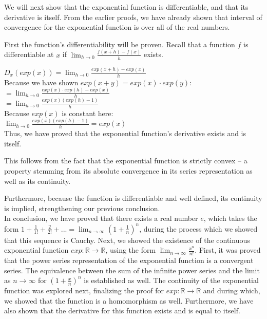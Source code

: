 \documentclass[12pt]{article}
\newcommand{\R}{\mathbb{R}}
\begin{document}
We will next show that the exponential function is differentiable, and that its derivative is itself. From the earlier proofs, we have already shown that interval of convergence for the exponential function is over all of the real numbers.

First the function's differentiability will be proven. Recall that a function $f$ is differentiable at $x$ if
$\lim_{h \rightarrow 0} \frac{f(x+h)-f(x)}{h}$ exists.

$D_x(exp(x)) = \lim_{h \rightarrow 0} \frac{exp(x+h)-exp(x)}{h}$\\

Because we have shown $exp(x+y) = exp(x) \cdot exp(y)$:\\

$= \lim_{h \rightarrow 0} \frac{exp(x) \cdot exp(h) - exp(x)}{h}$\\

$= \lim_{h \rightarrow 0} \frac{exp(x) (exp(h)-1)}{h}$\\

Because $exp(x)$ is constant here:\\

$\lim_{h \rightarrow 0} \frac{exp(x) (exp(h)-1)}{h} = exp(x)$\\

Thus, we have proved that the exponential function's derivative exists and is itself.

This follows from the fact that the exponential function is strictly convex -- a property stemming from its absolute convergence in its series representation as well as its continuity.

Furthermore, because the function is differentiable and well defined, its continuity is implied, strengthening our previous conclusion.\\

In conclusion, we have proved that there exists a real number $e$, which takes the form $1 + \frac{1}{1!} + \frac{2}{2!} + ... = \lim_{n \rightarrow \infty} (1 + \frac{1}{n})^n$, during the process which we showed that this sequence is Cauchy. Next, we showed the existence of the continuous exponential function $exp: \R \rightarrow \R$, using the form $\lim_{n \rightarrow \infty} \frac{x^n}{n!}$. First, it was proved that the power series representation of the exponential function is a convergent series. The equivalence between the sum of the infinite power series and the limit as $n \rightarrow \infty$ for $(1 + \frac{x}{n})^n$ is established as well. The continuity of the exponential function was explored next, finalizing the proof for $exp: \R \rightarrow \R$ and during which, we showed that the function is a homomorphism as well. Furthermore, we have also shown that the derivative for this function exists and is equal to itself.
\end{document}
